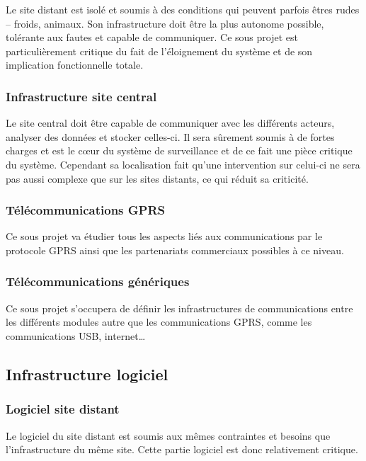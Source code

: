 \documentclass[a4paper, 11pt, draft]{report}
\begin{document}
Le site distant est isolé et soumis à des conditions qui peuvent parfois êtres rudes -- froids, animaux. Son infrastructure doit être la plus autonome possible, tolérante aux fautes et capable de communiquer. Ce sous projet est particulièrement critique du fait de l'éloignement du système et de son implication fonctionnelle totale.


\subsubsection{Infrastructure site central}

Le site central doit être capable de communiquer avec les différents acteurs, analyser des données et stocker celles-ci. Il sera sûrement soumis à de fortes charges et est le cœur du système de surveillance et de ce fait une pièce critique du système. Cependant sa localisation fait qu'une intervention sur celui-ci ne sera pas aussi complexe que sur les sites distants, ce qui réduit sa criticité.

\subsubsection{Télécommunications GPRS}

Ce sous projet va étudier tous les aspects liés aux communications par le protocole GPRS ainsi que les partenariats commerciaux possibles à ce niveau. 

\subsubsection{Télécommunications génériques}

Ce sous projet s'occupera de définir les infrastructures de communications entre les différents modules autre que les communications GPRS, comme les communications USB, internet\ldots

\subsection{Infrastructure logiciel}

\subsubsection{Logiciel site distant}

Le logiciel du site distant est soumis aux mêmes contraintes et besoins que l'infrastructure du même site. Cette partie logiciel est donc relativement critique.
\end{document}
